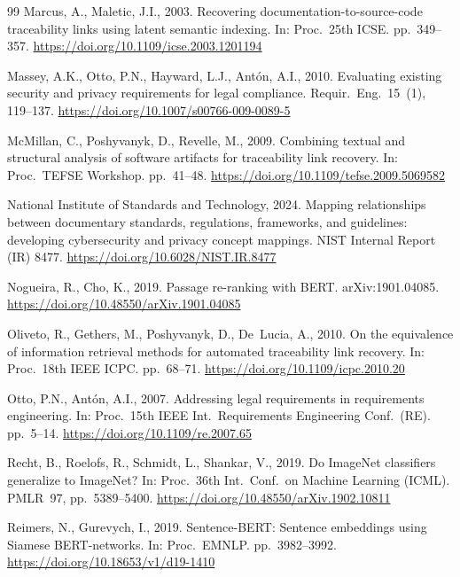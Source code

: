 \documentclass[a4paper,fleqn]{cas-sc}
\begin{document}
\begin{thebibliography}{99}
Marcus, A., Maletic, J.I., 2003. Recovering documentation-to-source-code traceability links using latent semantic indexing. In: Proc.\ 25th ICSE. pp.\ 349--357. \url{https://doi.org/10.1109/icse.2003.1201194}

Massey, A.K., Otto, P.N., Hayward, L.J., Ant\'on, A.I., 2010. Evaluating existing security and privacy requirements for legal compliance. Requir.\ Eng.\ 15~(1), 119--137. \url{https://doi.org/10.1007/s00766-009-0089-5}

McMillan, C., Poshyvanyk, D., Revelle, M., 2009. Combining textual and structural analysis of software artifacts for traceability link recovery. In: Proc.\ TEFSE Workshop. pp.\ 41--48. \url{https://doi.org/10.1109/tefse.2009.5069582}

National Institute of Standards and Technology, 2024. Mapping relationships between documentary standards, regulations, frameworks, and guidelines: developing cybersecurity and privacy concept mappings. NIST Internal Report (IR) 8477. \url{https://doi.org/10.6028/NIST.IR.8477}

Nogueira, R., Cho, K., 2019. Passage re-ranking with BERT. arXiv:1901.04085. \url{https://doi.org/10.48550/arXiv.1901.04085}

Oliveto, R., Gethers, M., Poshyvanyk, D., De~Lucia, A., 2010. On the equivalence of information retrieval methods for automated traceability link recovery. In: Proc.\ 18th IEEE ICPC. pp.\ 68--71. \url{https://doi.org/10.1109/icpc.2010.20}

Otto, P.N., Ant\'on, A.I., 2007. Addressing legal requirements in requirements engineering. In: Proc.\ 15th IEEE Int.\ Requirements Engineering Conf.\ (RE). pp.\ 5--14. \url{https://doi.org/10.1109/re.2007.65}

Recht, B., Roelofs, R., Schmidt, L., Shankar, V., 2019. Do ImageNet classifiers generalize to ImageNet? In: Proc.\ 36th Int.\ Conf.\ on Machine Learning (ICML). PMLR~97, pp.\ 5389--5400. \url{https://doi.org/10.48550/arXiv.1902.10811}

Reimers, N., Gurevych, I., 2019. Sentence-BERT: Sentence embeddings using Siamese BERT-networks. In: Proc.\ EMNLP. pp.\ 3982--3992. \url{https://doi.org/10.18653/v1/d19-1410}


\end{thebibliography}
\end{document}
